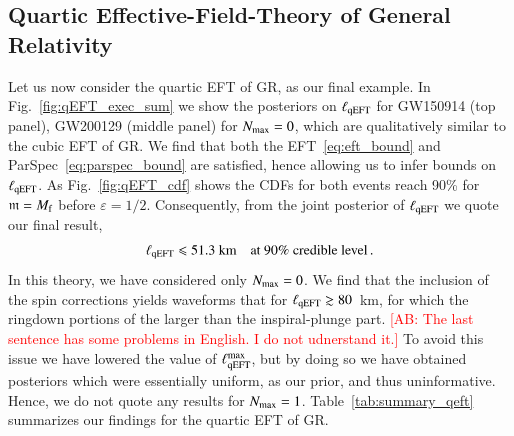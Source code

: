 \documentclass[twocolumn,
               prd,
               aps,
               superscriptaddress,
               tightenlines,
               nofootinbib,
               eqsecnum,
               amsfonts,
               amsmath,
               longbibliography]{revtex4-1}
\newcommand{\gm}{\mathfrak{m}}
\newcommand{\abcomm}[1]{{\textcolor{red}{{[AB: #1]}}}}
\begin{document}
\subsection{Quartic Effective-Field-Theory of General Relativity}
\label{sec:results_qeft}

Let us now consider the quartic EFT of GR, as our final example.
%
In Fig.~\ref{fig:qEFT_exec_sum} we show the posteriors on $\ell_{\rm qEFT}$ for GW150914 (top panel),
GW200129 (middle panel) for $N_{\rm max} = 0$, which are qualitatively similar to the cubic EFT of GR.
%
We find that both the EFT~\eqref{eq:eft_bound} and ParSpec~\eqref{eq:parspec_bound} are satisfied,
hence allowing us to infer bounds on $\ell_{\rm qEFT}$.
%
As Fig.~\ref{fig:qEFT_cdf} shows the CDFs for both events reach 90\% for $\gm = M_{\rm f}$ before $\varepsilon = 1/2$.
%
Consequently, from the joint posterior of $\ell_{\rm qEFT}$ we quote our final result,
%
\begin{equation}
    \ell_{\rm qEFT} \leqslant 51.3~\textrm{km} \quad \textrm{at 90\% credible level}\,.
\end{equation}
%
In this theory, we have considered only $N_{\rm max} = 0$. We find that the
inclusion of the spin corrections yields waveforms that for $\ell_{\rm qEFT} \gtrsim 80$~km,
for which the ringdown portions of the larger than the inspiral-plunge part. \abcomm{The last sentence
has some problems in English. I do not udnerstand it.}
%
To avoid this issue we have lowered the value of $\ell^{\rm max}_{\rm qEFT}$, but by doing so we have obtained posteriors
which were essentially uniform, as our prior, and thus uninformative. Hence, we do not quote any results for $N_{\rm max} = 1$.
%
Table~\ref{tab:summary_qeft} summarizes our findings for the quartic EFT of GR.
%
\end{document}

